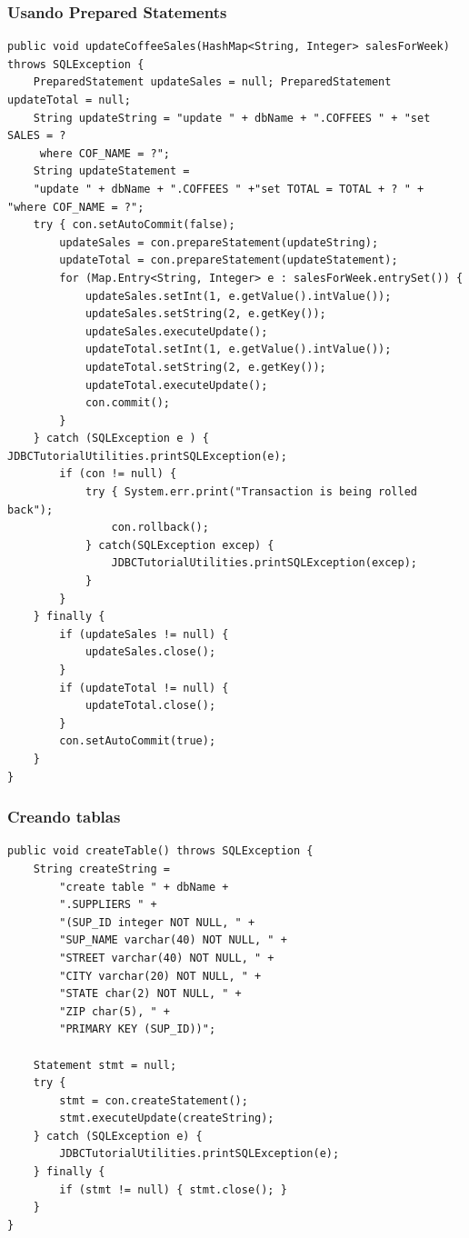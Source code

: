 \documentclass{beamer}
\begin{document}
\begin{frame}[fragile]
\frametitle{Usando Prepared Statements}
\begin{tiny}
\begin{verbatim}
public void updateCoffeeSales(HashMap<String, Integer> salesForWeek) throws SQLException {
    PreparedStatement updateSales = null; PreparedStatement updateTotal = null;
    String updateString = "update " + dbName + ".COFFEES " + "set SALES = ?
     where COF_NAME = ?";
    String updateStatement = 
    "update " + dbName + ".COFFEES " +"set TOTAL = TOTAL + ? " + "where COF_NAME = ?";
    try { con.setAutoCommit(false);
        updateSales = con.prepareStatement(updateString);
        updateTotal = con.prepareStatement(updateStatement);
        for (Map.Entry<String, Integer> e : salesForWeek.entrySet()) {
            updateSales.setInt(1, e.getValue().intValue());
            updateSales.setString(2, e.getKey());
            updateSales.executeUpdate();
            updateTotal.setInt(1, e.getValue().intValue());
            updateTotal.setString(2, e.getKey());
            updateTotal.executeUpdate();
            con.commit();
        }
    } catch (SQLException e ) { JDBCTutorialUtilities.printSQLException(e);
        if (con != null) {
            try { System.err.print("Transaction is being rolled back");
                con.rollback();
            } catch(SQLException excep) {
                JDBCTutorialUtilities.printSQLException(excep);
            }
        }
    } finally {
        if (updateSales != null) {
            updateSales.close();
        }
        if (updateTotal != null) {
            updateTotal.close();
        }
        con.setAutoCommit(true);
    }
}
\end{verbatim}
\end{tiny}
\end{frame}

\begin{frame}[fragile]
\frametitle{Creando tablas}
\begin{footnotesize}
\begin{verbatim}
public void createTable() throws SQLException {
    String createString =
        "create table " + dbName +
        ".SUPPLIERS " +
        "(SUP_ID integer NOT NULL, " +
        "SUP_NAME varchar(40) NOT NULL, " +
        "STREET varchar(40) NOT NULL, " +
        "CITY varchar(20) NOT NULL, " +
        "STATE char(2) NOT NULL, " +
        "ZIP char(5), " +
        "PRIMARY KEY (SUP_ID))";

    Statement stmt = null;
    try {
        stmt = con.createStatement();
        stmt.executeUpdate(createString);
    } catch (SQLException e) {
        JDBCTutorialUtilities.printSQLException(e);
    } finally {
        if (stmt != null) { stmt.close(); }
    }
}
\end{verbatim}
\end{footnotesize}
\end{frame}
\end{document}
